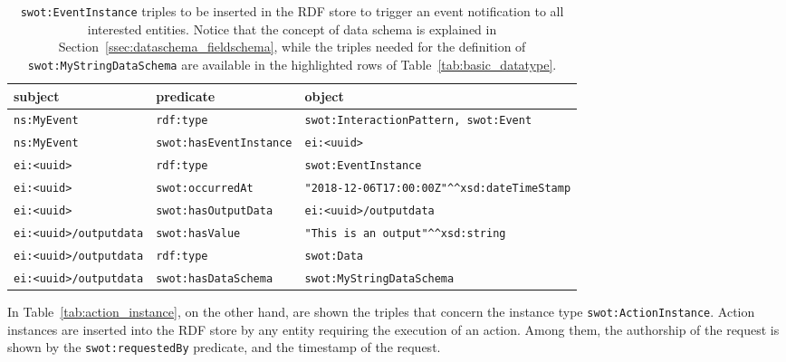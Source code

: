 \begin{table*}[t]
\centering
\footnotesize
\caption{\texttt{swot:EventInstance} triples to be inserted in the RDF store to trigger an event notification to all interested entities. Notice that the concept of data schema is explained in Section~\ref{ssec:dataschema_fieldschema}, while the triples needed for the definition of \texttt{swot:MyStringDataSchema} are available in the highlighted rows of Table~\ref{tab:basic_datatype}.}
\label{tab:event_instance}
\begin{tabular}{lll}
\textbf{subject}           & \textbf{predicate}           & \textbf{object}           \\ \hline
\texttt{ns:MyEvent}       & \texttt{rdf:type}            & \texttt{swot:InteractionPattern, swot:Event}  \\ \hline
\texttt{ns:MyEvent}       & \texttt{swot:hasEventInstance}   & \texttt{ei:<uuid>} \\ \hline
\texttt{ei:<uuid>} & \texttt{rdf:type} & \texttt{swot:EventInstance}  \\ \hline
\texttt{ei:<uuid>} & \texttt{swot:occurredAt} & \texttt{"2018-12-06T17:00:00Z"\textasciicircum \textasciicircum xsd:dateTimeStamp}  \\ \hline
\texttt{ei:<uuid>}& \texttt{swot:hasOutputData} & \texttt{ei:<uuid>/outputdata}   \\ \hline
\texttt{ei:<uuid>/outputdata}& \texttt{swot:hasValue}  & \texttt{"This is an output"\textasciicircum \textasciicircum xsd:string} \\ \hline
\texttt{ei:<uuid>/outputdata} & \texttt{rdf:type} & \texttt{swot:Data}\\ \hline
\texttt{ei:<uuid>/outputdata} & \texttt{swot:hasDataSchema} & \texttt{swot:MyStringDataSchema}\\ \hline
\end{tabular}
\end{table*}

In Table~\ref{tab:action_instance}, on the other hand, are shown the triples that concern the instance type  \texttt{swot:ActionInstance}. Action instances are inserted into the RDF store by any entity requiring the execution of an action. Among them, the authorship of the request is shown by the \texttt{swot:requestedBy} predicate, and the timestamp of the request.

